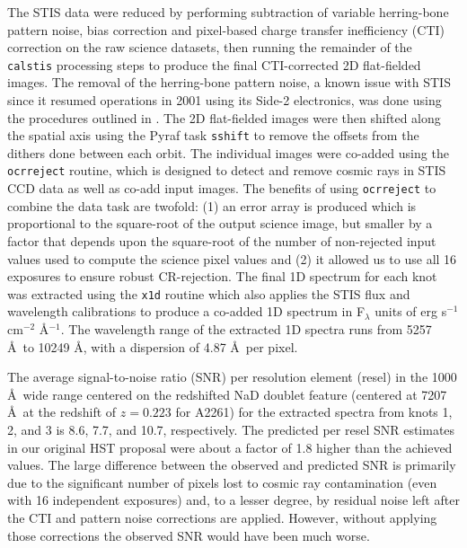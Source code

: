 \documentclass[useAMS,usenatbib]{emulateapj}
\newcommand{\fixme}[1]{{\color{red} #1 }}
\begin{document}
The STIS data were reduced by performing subtraction of variable herring-bone pattern noise, bias correction and pixel-based charge transfer inefficiency (CTI) correction on the raw science datasets, then running the remainder of the {\tt calstis} processing steps to produce the final CTI-corrected 2D flat-fielded images. The removal of the herring-bone pattern noise, a known issue with STIS since it resumed operations in 2001 using its Side-2 electronics, was done using the procedures outlined in \cite{jansen}. The 2D flat-fielded images were then shifted along the spatial axis using the Pyraf task {\tt sshift} to remove the offsets from the dithers done between each orbit. The individual images were co-added using the {\tt ocrreject} routine, which is designed to detect and remove cosmic rays in STIS CCD data as well as co-add input images. The benefits of using {\tt ocrreject} to combine the data task are twofold: (1) an error array is produced which is proportional to the square-root of the output science image, but smaller by a factor that depends upon the square-root of the number of non-rejected input values used to compute the science pixel values and (2) it allowed us to use all 16 exposures to ensure robust CR-rejection. The final 1D spectrum for each knot was extracted using the {\tt x1d} routine which also applies the STIS flux and wavelength calibrations to produce a co-added 1D spectrum in F$_\lambda$ units of erg s$^{-1}$ cm$^{-2}$ \AA$^{-1}$. The wavelength range of the extracted 1D spectra runs from 5257 \AA\ to 10249 \AA, with a dispersion of 4.87 \AA\ per pixel.

The average signal-to-noise ratio (SNR) per resolution element (resel) in the 1000 \AA\ wide range centered on the redshifted NaD doublet feature (centered at 7207 \AA\ at the  redshift of $z=0.223$ for A2261) for the extracted spectra from knots 1, 2, and 3 is 8.6, 7.7, and 10.7, respectively. The predicted per resel SNR estimates in our original HST proposal were about a factor of 1.8 higher than the achieved values. The large difference between the observed and predicted SNR is primarily due to the significant number of pixels lost to cosmic ray contamination (even with 16 independent exposures) and, to a lesser degree, by residual noise left after the CTI and pattern noise corrections are applied. However, without applying those corrections the observed SNR would have been much worse.

\end{document}
